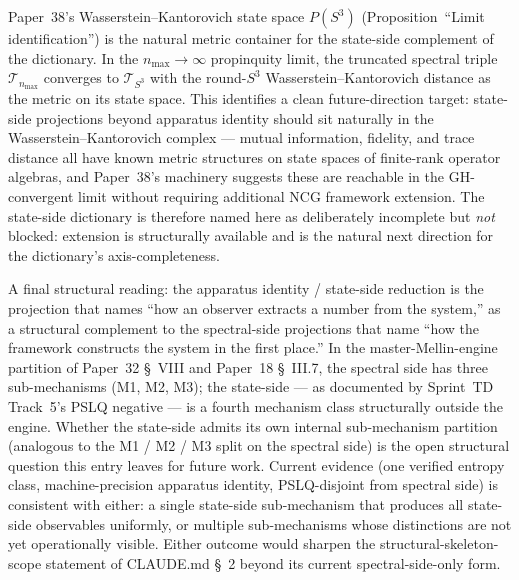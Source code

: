Paper~38's Wasserstein--Kantorovich state space $P(S^3)$
(Proposition~``Limit identification'') is the natural metric
container for the state-side complement of the dictionary.  In the
$n_{\max} \to \infty$ propinquity limit, the truncated spectral
triple $\mathcal{T}_{n_{\max}}$ converges to $\mathcal{T}_{S^3}$ with
the round-$S^3$ Wasserstein--Kantorovich distance as the metric on
its state space.  This identifies a clean future-direction target:
state-side projections beyond apparatus identity should sit naturally
in the Wasserstein--Kantorovich complex --- mutual information,
fidelity, and trace distance all have known metric structures on
state spaces of finite-rank operator algebras, and Paper~38's
machinery suggests these are reachable in the GH-convergent limit
without requiring additional NCG framework extension.  The state-side
dictionary is therefore named here as deliberately incomplete but
\emph{not} blocked: extension is structurally available and is the
natural next direction for the dictionary's axis-completeness.

A final structural reading: the apparatus identity / state-side
reduction is the projection that names ``how an observer extracts a
number from the system,'' as a structural complement to the
spectral-side projections that name ``how the framework constructs
the system in the first place.''  In the master-Mellin-engine
partition of Paper~32 \S~VIII and Paper~18 \S~III.7, the spectral
side has three sub-mechanisms (M1, M2, M3); the state-side --- as
documented by Sprint~TD Track~5's PSLQ negative --- is a fourth
mechanism class structurally outside the engine.  Whether the
state-side admits its own internal sub-mechanism partition
(analogous to the M1 / M2 / M3 split on the spectral side) is the
open structural question this entry leaves for future work.  Current
evidence (one verified entropy class, machine-precision apparatus
identity, PSLQ-disjoint from spectral side) is consistent with
either: a single state-side sub-mechanism that produces all
state-side observables uniformly, or multiple sub-mechanisms whose
distinctions are not yet operationally visible.  Either outcome would
sharpen the structural-skeleton-scope statement of CLAUDE.md \S~2
beyond its current spectral-side-only form.
